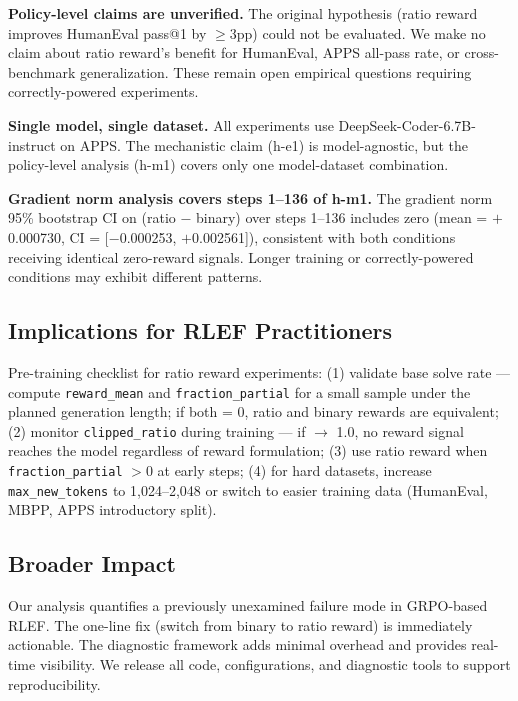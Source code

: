 \textbf{Policy-level claims are unverified.} The original hypothesis (ratio reward improves HumanEval pass@1 by $\geq$3pp) could not be evaluated. We make no claim about ratio reward's benefit for HumanEval, APPS all-pass rate, or cross-benchmark generalization. These remain open empirical questions requiring correctly-powered experiments.

\textbf{Single model, single dataset.} All experiments use DeepSeek-Coder-6.7B-instruct on APPS. The mechanistic claim (h-e1) is model-agnostic, but the policy-level analysis (h-m1) covers only one model-dataset combination.

\textbf{Gradient norm analysis covers steps 1--136 of h-m1.} The gradient norm 95\% bootstrap CI on (ratio $-$ binary) over steps 1--136 includes zero (mean = $+$0.000730, CI = $[-$0.000253, $+$0.002561]), consistent with both conditions receiving identical zero-reward signals. Longer training or correctly-powered conditions may exhibit different patterns.

\subsection{Implications for RLEF Practitioners}

Pre-training checklist for ratio reward experiments: (1) validate base solve rate --- compute \texttt{reward\_mean} and \texttt{fraction\_partial} for a small sample under the planned generation length; if both = 0, ratio and binary rewards are equivalent; (2) monitor \texttt{clipped\_ratio} during training --- if $\to$ 1.0, no reward signal reaches the model regardless of reward formulation; (3) use ratio reward when \texttt{fraction\_partial} $> 0$ at early steps; (4) for hard datasets, increase \texttt{max\_new\_tokens} to 1,024--2,048 or switch to easier training data (HumanEval, MBPP, APPS introductory split).

\subsection{Broader Impact}

Our analysis quantifies a previously unexamined failure mode in GRPO-based RLEF. The one-line fix (switch from binary to ratio reward) is immediately actionable. The diagnostic framework adds minimal overhead and provides real-time visibility. We release all code, configurations, and diagnostic tools to support reproducibility.
